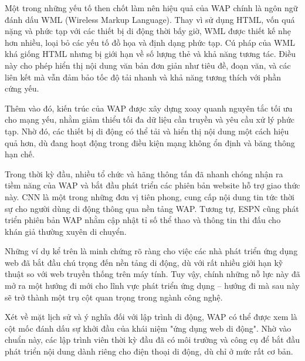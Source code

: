   \begin{flushleft}
  \hspace*{0.8cm}Một trong những yếu tố then chốt làm nên hiệu quả của WAP chính là ngôn ngữ đánh dấu WML (Wireless Markup Language). Thay vì sử dụng HTML, vốn quá nặng và phức tạp với các thiết bị di động thời bấy giờ, WML được thiết kế nhẹ hơn nhiều, loại bỏ các yếu tố đồ họa và định dạng phức tạp. Cú pháp của WML khá giống HTML nhưng bị giới hạn về số lượng thẻ và khả năng tương tác. Điều này cho phép hiển thị nội dung văn bản đơn giản như tiêu đề, đoạn văn, và các liên kết mà vẫn đảm bảo tốc độ tải nhanh và khả năng tương thích với phần cứng yếu.
  \end{flushleft}
  
  \begin{flushleft}
  \hspace*{0.8cm}Thêm vào đó, kiến trúc của WAP được xây dựng xoay quanh nguyên tắc tối ưu cho mạng yếu, nhằm giảm thiểu tối đa dữ liệu cần truyền và yêu cầu xử lý phức tạp. Nhờ đó, các thiết bị di động có thể tải và hiển thị nội dung một cách hiệu quả hơn, dù đang hoạt động trong điều kiện mạng không ổn định và băng thông hạn chế.
  \end{flushleft}
  
  \begin{flushleft}
  \hspace*{0.8cm}Trong thời kỳ đầu, nhiều tổ chức và hãng thông tấn đã nhanh chóng nhận ra tiềm năng của WAP và bắt đầu phát triển các phiên bản website hỗ trợ giao thức này. CNN là một trong những đơn vị tiên phong, cung cấp nội dung tin tức thời sự cho người dùng di động thông qua nền tảng WAP. Tương tự, ESPN cũng phát triển phiên bản WAP nhằm cập nhật tỉ số thể thao và thông tin thi đấu cho khán giả thường xuyên di chuyển.
  \end{flushleft}
  
  \begin{flushleft}
  \hspace*{0.8cm}Những ví dụ kể trên là minh chứng rõ ràng cho việc các nhà phát triển ứng dụng web đã bắt đầu chú trọng đến nền tảng di động, dù với rất nhiều giới hạn kỹ thuật so với web truyền thống trên máy tính. Tuy vậy, chính những nỗ lực này đã mở ra một hướng đi mới cho lĩnh vực phát triển ứng dụng – hướng đi mà sau này sẽ trở thành một trụ cột quan trọng trong ngành công nghệ.
  \end{flushleft}
  
  \begin{flushleft}
  \hspace*{0.8cm}Xét về mặt lịch sử và ý nghĩa đối với lập trình di động, WAP có thể được xem là cột mốc đánh dấu sự khởi đầu của khái niệm "ứng dụng web di động". Nhờ vào chuẩn này, các lập trình viên thời kỳ đầu đã có môi trường và công cụ để bắt đầu phát triển nội dung dành riêng cho điện thoại di động, dù chỉ ở mức rất cơ bản.
  \end{flushleft}
  

